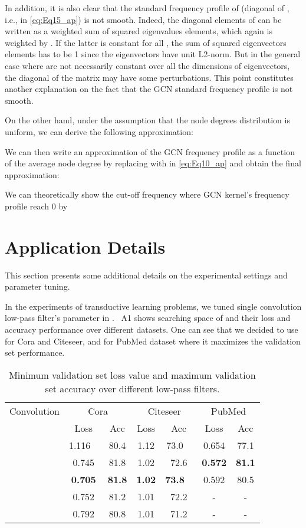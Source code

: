 \documentclass{article}
\begin{document}
In addition, it is also clear that the standard frequency profile of  (diagonal of , i.e.,  in \eqref{eq:Eq15_ap}) is not smooth. Indeed, the diagonal elements of  can be written as a weighted sum of squared eigenvalues elements, which again is weighted by . If the latter is constant for all , the sum of squared eigenvectors elements has to be 1 since the eigenvectors have unit L2-norm. But in the general case where  are not necessarily constant over all the dimensions of eigenvectors, the diagonal of the matrix may have some perturbations. This point constitutes another explanation on the fact that the GCN standard frequency profile is not smooth.

On the other hand, under the assumption that the node degrees distribution is uniform, we can derive the following approximation:

We can then write an approximation of the GCN frequency profile as a function of the average node degree by replacing  with  in \eqref{eq:Eq10_ap} and obtain the final approximation:

We can theoretically show the cut-off frequency where GCN kernel's frequency profile reach 0 by



\section{Application Details}
\label{section:appdetails}

This section presents some additional details on the experimental settings and parameter tuning.

In the experiments of transductive learning problems, we tuned single convolution low-pass filter's parameter  in . \tablename~A1 shows searching space of  and their loss and accuracy performance over different datasets. One can see that we decided to use  for Cora and Citeseer, and  for PubMed dataset where it maximizes the validation set performance.

\begin{table}[!h]
\renewcommand{\arraystretch}{1.3}
\caption{Minimum validation set loss value and maximum validation set accuracy over different low-pass filters.}
\centering
\begin{tabular}{c c c c c c c}
Convolution & \multicolumn{2}{c}{Cora} & \multicolumn{2}{c}{Citeseer} & \multicolumn{2}{c}{PubMed}  \\
 & Loss & Acc & Loss & Acc & Loss & Acc \\
\toprule
  &1.116  &80.4 & 1.12 & 73.0   &0.654 &77.1 \\
 &0.745 &81.8 &1.02 &72.6 &\textbf{0.572} &\textbf{81.1} \\
 &\textbf{0.705} &\textbf{81.8} &\textbf{1.02} &\textbf{73.8}   &0.592 &80.5 \\
 &0.752 &81.2 &1.01 &72.2 &- &- \\
 &0.792 &80.8 &1.01 &71.2 &- &- \\

\bottomrule
\end{tabular}
\label{tabletdesign}

\end{table}
\end{document}
